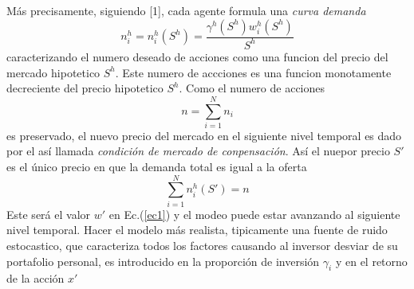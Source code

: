 \documentclass[12pt,a4paper]{article}
\begin{document}
\quad Más precisamente, siguiendo [1], cada agente formula una \textit{ curva demanda}
\begin{equation}
n^h_i=n^h_i(S^h)=\frac{\gamma^h(S^h)w^h_i(S^h)}{S^h}
\end{equation}  
caracterizando el numero deseado de acciones como una funcion del precio del mercado hipotetico $S^h$. Este numero de accciones es una funcion monotamente decreciente del precio hipotetico $S^h$. Como el numero de acciones
\begin{equation}
n= \sum^{N}_{i=1}n_i
\end{equation}
es preservado, el nuevo precio del mercado en el siguiente nivel temporal es dado por el así llamada \textit{condición de mercado de conpensación}. Así el nuepor precio $S'$ es el único precio en que la demanda total es igual a la oferta
\begin{equation}
\sum^{N}_{i=1}n^h_i(S')=n
\end{equation} 
Este será el valor $w'$ en Ec.(\ref{ec1}) y el modeo puede estar avanzando al siguiente nivel temporal. Hacer el modelo más realista, tipicamente una fuente de ruido estocastico, que caracteriza todos los factores causando al inversor desviar de su portafolio personal, es introducido en la proporción de inversión $\gamma_i$ y en el retorno de la acción $x'$ 
\end{document}
